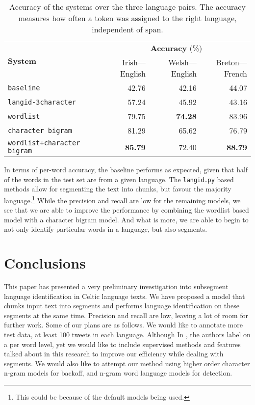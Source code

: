 \documentclass[11pt]{article}
\begin{document}
\begin{table}
\begin{center}
\begin{tabular}{|l|r|r|r|}
\hline
\multirow{2}{*}{\textbf{System}} &  \multicolumn{3}{c|}{\textbf{Accuracy} (\%)} \\\cline{2-4}
       &   Irish---English & Welsh---English & Breton---French \\ 
\hline
\texttt{baseline} & 42.76 & 42.16 & 44.07 \\
\hline
\texttt{langid-3character} & 57.24 & 45.92 & 43.16 \\
\hline
\texttt{wordlist} & 79.75 & \textbf{74.28} & 83.96 \\
\hline
\texttt{character bigram} & 81.29 & 65.62 & 76.79 \\
\hline
\texttt{wordlist+character bigram} & \textbf{85.79} & 72.40 & \textbf{88.79} \\
\hline
\end{tabular}
\end{center}
\caption{Accuracy of the systems over the three language pairs. The accuracy measures how often a token
  was assigned to the right language, independent of span.}
\label{table:accuracy}
\end{table}

In terms of per-word accuracy, the baseline performs as expected, given that half of the words in the test set are from a given language. 
The \texttt{langid.py} based methods allow for segmenting the text into chunks, but favour the majority language.\footnote{This could be because of the default models being used.} While the precision and recall are low for the remaining models, we see that we are able to improve 
the performance by combining the wordlist based model with a character bigram model. And what is more, we are able to begin to not only 
identify particular words in a language, but also segments.

\section{Conclusions}
\label{sec:conclusions}

This paper has presented a very preliminary investigation into subsegment language identification in Celtic language texts. We have
proposed a model that chunks input text into segments and performs language identification on these segments at the same time. Precision and
recall are low, leaving a lot of room for further work. Some of our plans are as follows. We would like to annotate more test data,
at least 100 tweets in each language. Although In \cite{king2013labeling}, the authors label on a per word level, yet we would like to include supervised methods and features talked about in this research to improve our efficiency while dealing with segments. We would also like to attempt our method using higher order character n-gram models for backoff, and n-gram word language models for detection. 
\end{document}
